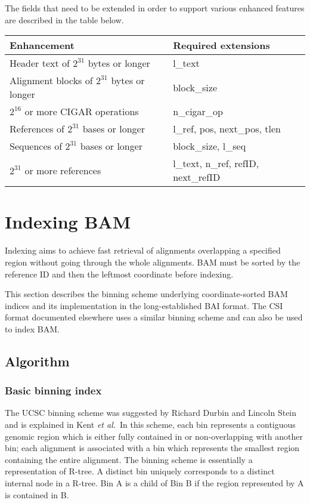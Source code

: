 \documentclass[10pt]{article}
\begin{document}
The fields that need to be extended in order to support various enhanced
features are described in the table below.

\begin{table}[ht]
\centering
\begin{tabular}{|l|l|}
\hline
{\bf Enhancement} & {\bf Required extensions} \\\hline
Header text of $2^{31}$ bytes or longer & {\sf l\_text} \\\hline
Alignment blocks of $2^{31}$ bytes or longer & {\sf block\_size} \\\hline
$2^{16}$ or more CIGAR operations & {\sf n\_cigar\_op} \\\hline
References of $2^{31}$ bases or longer & {\sf l\_ref}, {\sf pos}, {\sf next\_pos}, {\sf tlen} \\\hline
Sequences of $2^{31}$ bases or longer & {\sf block\_size}, {\sf l\_seq} \\\hline
$2^{31}$ or more references & {\sf l\_text}, {\sf n\_ref}, {\sf refID}, {\sf next\_refID} \\\hline
\end{tabular}
\end{table}

\pagebreak

\section{Indexing BAM}
Indexing aims to achieve fast retrieval of alignments overlapping a
specified region without going through the whole alignments. BAM must be
sorted by the reference ID and then the leftmost coordinate before
indexing.

This section describes the binning scheme underlying coordinate-sorted
BAM indices and its implementation in the long-established BAI format.
The CSI format documented elsewhere uses a similar binning scheme and
can also be used to index BAM.\footnotemark


\subsection{Algorithm}
\subsubsection{Basic binning index}
The UCSC binning scheme was suggested by Richard Durbin and Lincoln Stein
and is explained in Kent {\it et al.}\footnotemark\ In this scheme, each bin
represents a contiguous genomic region which is either fully contained
in or non-overlapping with another bin; each alignment is associated
with a bin which represents the smallest region containing the entire
alignment. The binning scheme is essentially a representation of
R-tree. A distinct bin uniquely corresponds to a distinct internal node
in a R-tree. Bin A is a child of Bin B if the region represented by A is
contained in B.
\end{document}
